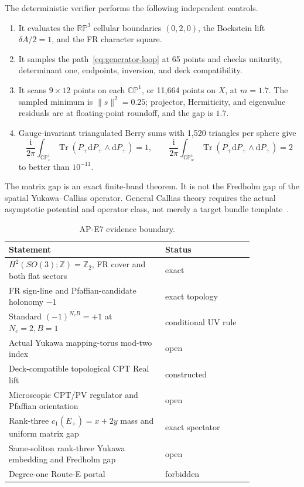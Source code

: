 \documentclass[11pt]{article}
\theoremstyle{definition}
\theoremstyle{remark}
\newcommand{\ii}{\mathrm i}
\newcommand{\dd}{\mathrm d}
\newcommand{\ZZ}{\mathbb Z}
\newcommand{\CP}{\mathbb {CP}}
\newcommand{\RP}{\mathbb {RP}}
\newcommand{\Tr}{\operatorname{Tr}}
\newcommand{\status}[1]{\textcolor{blue!60!black}{\textsf{#1}}}
\begin{document}
The deterministic verifier performs the following independent controls.
\begin{enumerate}[label=(\arabic*)]
\item It evaluates the \(\RP^3\) cellular boundaries \((0,2,0)\), the
  Bockstein lift \(\delta A/2=1\), and the FR character square.
\item It samples the path~\eqref{eq:generator-loop} at 65 points and checks
  unitarity, determinant one, endpoints, inversion, and deck compatibility.
\item It scans \(9\times12\) points on each \(\CP^1\), or 11,664 points on
  \(X\), at \(m=1.7\).  The sampled minimum is
  \(\lVert s\rVert^2=0.25\); projector, Hermiticity, and eigenvalue residuals
  are at floating-point roundoff, and the gap is \(1.7\).
\item Gauge-invariant triangulated Berry sums with 1,520 triangles per sphere
  give
  \[
  \frac{\ii}{2\pi}\int_{\CP^1_z}\Tr(P_+\dd P_+\wedge\dd P_+)=1,
  \qquad
  \frac{\ii}{2\pi}\int_{\CP^1_w}\Tr(P_+\dd P_+\wedge\dd P_+)=2
  \]
  to better than \(10^{-11}\).
\end{enumerate}
The matrix gap is an exact finite-band theorem.  It is not the Fredholm gap of
the spatial Yukawa--Callias operator.  General Callias theory requires the
actual asymptotic potential and operator class, not merely a target bundle
template~\cite{VanDenDungen2025APE7}.

\begin{table}[ht]
\centering
\caption{AP-E7 evidence boundary.}
\begin{tabular}{L{0.53\linewidth}L{0.30\linewidth}}
\toprule
Statement & Status\\
\midrule
\(H^2(SO(3);\ZZ)=\ZZ_2\), FR cover and both flat sectors & \status{exact}\\
FR sign-line and Pfaffian-candidate holonomy \(-1\) & \status{exact topology}\\
Standard \((-1)^{N_cB}=+1\) at \(N_c=2,B=1\) & \status{conditional UV rule}\\
Actual Yukawa mapping-torus mod-two index & \status{open}\\
Deck-compatible topological CPT Real lift & \status{constructed}\\
Microscopic CPT/PV regulator and Pfaffian orientation & \status{open}\\
Rank-three \(c_1(E_+)=x+2y\) mass and uniform matrix gap & \status{exact spectator}\\
Same-soliton rank-three Yukawa embedding and Fredholm gap & \status{open}\\
Degree-one Route-E portal & \status{forbidden}\\
\bottomrule
\end{tabular}
\end{table}
\end{document}
